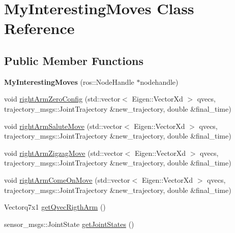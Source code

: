 \hypertarget{class_my_interesting_moves}{\section{My\-Interesting\-Moves Class Reference}
\label{class_my_interesting_moves}
}
\subsection*{Public Member Functions}
\begin{DoxyCompactItemize}
\item 
\hypertarget{class_my_interesting_moves_aec8a013d087eb83aff717768d78bfdcd}{{\bfseries My\-Interesting\-Moves} (ros\-::\-Node\-Handle $\ast$nodehandle)}\label{class_my_interesting_moves_aec8a013d087eb83aff717768d78bfdcd}

\item 
void \hyperlink{class_my_interesting_moves_a8466c238aa9af0c9a99fbb8a132454f1}{right\-Arm\-Zero\-Config} (std\-::vector$<$ Eigen\-::\-Vector\-Xd $>$ qvecs, trajectory\-\_\-msgs\-::\-Joint\-Trajectory \&new\-\_\-trajectory, double \&final\-\_\-time)
\item 
void \hyperlink{class_my_interesting_moves_afb21bc0508076a0eebea9fb968041933}{right\-Arm\-Salute\-Move} (std\-::vector$<$ Eigen\-::\-Vector\-Xd $>$ qvecs, trajectory\-\_\-msgs\-::\-Joint\-Trajectory \&new\-\_\-trajectory, double \&final\-\_\-time)
\item 
void \hyperlink{class_my_interesting_moves_a1adb0506f95f1ab0c64b7d09d08a39f5}{right\-Arm\-Zigzag\-Move} (std\-::vector$<$ Eigen\-::\-Vector\-Xd $>$ qvecs, trajectory\-\_\-msgs\-::\-Joint\-Trajectory \&new\-\_\-trajectory, double \&final\-\_\-time)
\item 
void \hyperlink{class_my_interesting_moves_a9559af6f2578c5ce5fa11765635ea3cd}{right\-Arm\-Come\-On\-Move} (std\-::vector$<$ Eigen\-::\-Vector\-Xd $>$ qvecs, trajectory\-\_\-msgs\-::\-Joint\-Trajectory \&new\-\_\-trajectory, double \&final\-\_\-time)
\item 
Vectorq7x1 \hyperlink{class_my_interesting_moves_a23a9e1c0dc0081934c6ff0f6cd6e57c9}{get\-Qvec\-Rigth\-Arm} ()
\item 
sensor\-\_\-msgs\-::\-Joint\-State \hyperlink{class_my_interesting_moves_af3f3a8ce529896e3d59457e2de176322}{get\-Joint\-States} ()
\end{DoxyCompactItemize}


